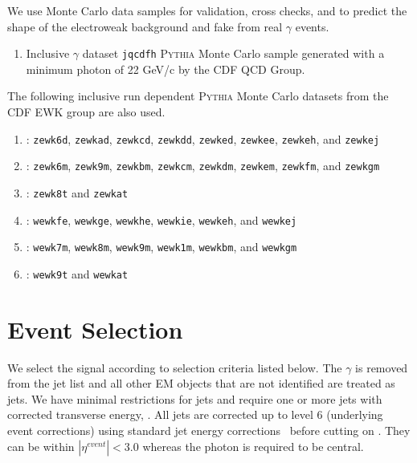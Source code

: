 \documentclass[11pt]{article}
\begin{document}
We use Monte Carlo data samples for validation, cross checks, and to predict the shape of the electroweak background and fake \met from real $\gamma$ events. 

\begin{enumerate}
 \item{Inclusive $\gamma$ dataset \texttt{jqcdfh} \textsc{Pythia} Monte Carlo sample generated with a minimum photon \pt of 22 GeV/c by the CDF QCD Group.}
 \end{enumerate}
 
\noindent The following inclusive run dependent \textsc{Pythia} Monte Carlo datasets from the CDF EWK group are also used.

\begin{enumerate}
\addtocounter{enumi}{1}
\item{\zee: \texttt{zewk6d}, \texttt{zewkad}, \texttt{zewkcd}, \texttt{zewkdd}, \texttt{zewked}, \texttt{zewkee}, \texttt{zewkeh}, and  \texttt{zewkej} }

\item{\zmm: \texttt{zewk6m}, \texttt{zewk9m}, \texttt{zewkbm}, \texttt{zewkcm}, \texttt{zewkdm}, \texttt{zewkem}, \texttt{zewkfm}, and \texttt{zewkgm}  }

\item{\ztt: \texttt{zewk8t} and \texttt{zewkat} }

\item{\wenu: \texttt{wewkfe}, \texttt{wewkge}, \texttt{wewkhe}, \texttt{wewkie}, \texttt{wewkeh}, and \texttt{wewkej} }
 
\item{\wmnu: \texttt{wewk7m}, \texttt{wewk8m}, \texttt{wewk9m}, \texttt{wewk1m}, \texttt{wewkbm}, and \texttt{wewkgm} }

\item{\wtnu: \texttt{wewk9t} and \texttt{wewkat} }

\end{enumerate}


\section{Event Selection}		
We select the \phojets signal according to selection criteria listed below. The $\gamma$ is removed from the jet list and all other EM objects that are not identified are treated as jets. We have minimal restrictions for jets and require one or more jets with corrected transverse energy, . All jets are corrected up to level 6 (underlying event corrections) using standard jet energy corrections~\cite{wwwJER} before cutting on \et. They can be within \mbox{$|\eta^{event}| < 3.0$} whereas the photon is required to be central.
\end{document}
